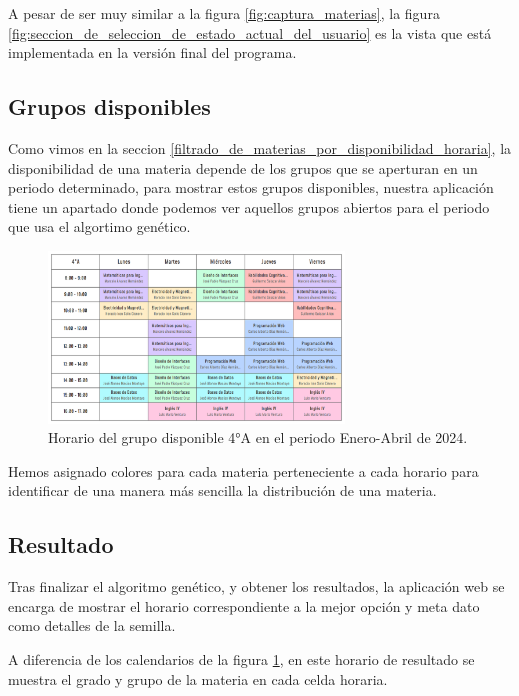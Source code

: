 A pesar de ser muy similar a la figura \ref{fig:captura_materias}, la figura \ref{fig:seccion_de_seleccion_de_estado_actual_del_usuario} es la vista que está implementada en la versión final del programa.

\subsection{Grupos disponibles} \label{grupos_disponibles}
Como vimos en la seccion \ref{filtrado_de_materias_por_disponibilidad_horaria}, la disponibilidad de una materia depende de los grupos que se aperturan en un periodo determinado, para mostrar estos grupos disponibles, nuestra aplicación tiene un apartado donde podemos ver aquellos grupos abiertos para el periodo que usa el algortimo genético.

\begin{figure}[h]
    \centering
    \includegraphics[width=0.7\textwidth]{images/available-groups.png}
    \caption{Horario del grupo disponible 4°A en el periodo Enero-Abril de 2024.}
    \label{fig:horario_del_grupo_disponible_4A_en_el_periodo_enero_abril_de_2024}
\end{figure}

Hemos asignado colores para cada materia perteneciente a cada horario para identificar de una manera más sencilla la distribución de una materia.

\subsection{Resultado} \label{resultados}
Tras finalizar el algoritmo genético, y obtener los resultados, la aplicación web se encarga de mostrar el horario correspondiente a la mejor opción y meta dato como detalles de la semilla.

A diferencia de los calendarios de la figura \ref{fig:horario_del_grupo_disponible_4A_en_el_periodo_enero_abril_de_2024}, en este horario de resultado se muestra el grado y grupo de la materia en cada celda horaria.

